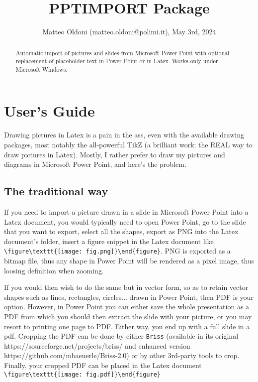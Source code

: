 \documentclass[10pt,,a4paper]{article}
\title{PPTIMPORT Package}
\author{%
Matteo Oldoni (matteo.oldoni@polimi.it), May 3rd, 2024
}
\begin{document}
\maketitle

\begin{abstract}
Automatic import of pictures and slides from Microsoft Power Point with optional replacement of placeholder text in Power Point or in Latex. Works only under Microsoft Windows.
\end{abstract}

\section{User's Guide}
Drawing pictures in Latex is a pain in the ass, even with the available drawing packages, most notably the all-powerful TikZ (a brilliant work: the REAL way to draw pictures in Latex).
Mostly, I rather prefer to draw my pictures and diagrams in Microsoft Power Point, and here's the problem.

\subsection{The traditional way}
If you need to import a picture drawn in a slide in Microsoft Power Point into a Latex document, you would typically need to open Power Point, go to the slide that you want to export, select all the shapes, export as PNG into the Latex document's folder, insert a figure snippet in the Latex document like  \verb=\figure\texttt{[image: fig.png]}\end{figure}=.
PNG is exported as a bitmap file, thus any shape in Power Point will be rendered as a pixel image, thus loosing definition when zooming.

If you would then wish to do the same but in vector form, so as to retain vector shapes such as lines, rectangles, circles... drawn in Power Point, then PDF is your option.
However, in Power Point you can either save the whole presentation as a PDF from which you should then extract the slide with your picture, or you may resort to printing one page to PDF. 
Either way, you end up with a full slide in a pdf.
Cropping the PDF can be done by either \verb=Briss= (available in its original https://sourceforge.net/projects/briss/ and enhanced version https://github.com/mbaeuerle/Briss-2.0) or by other 3rd-party tools to crop.
Finally, your cropped PDF can be placed in the Latex document \verb=\figure\texttt{[image: fig.pdf]}\end{figure}=
\end{document}
